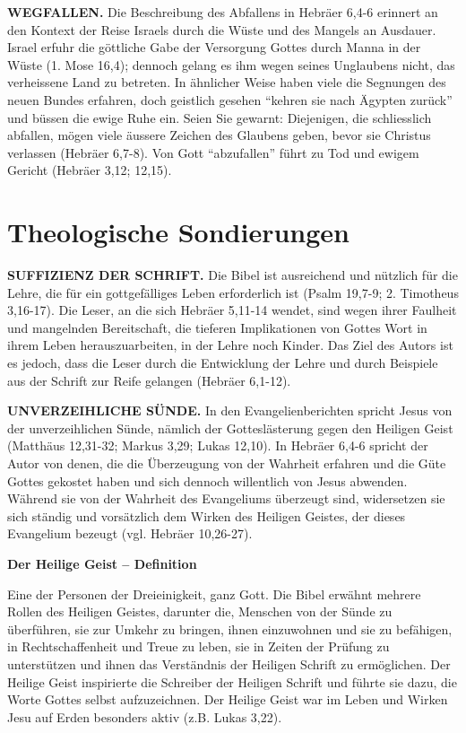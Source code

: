 \documentclass[
  12pt,
]{krantz}
\makeatletter
\newenvironment{kframe}{%
\medskip{}
\setlength{\fboxsep}{.8em}
 \def\at@end@of@kframe{}%
 \ifinner\ifhmode%
  \def\at@end@of@kframe{\end{minipage}}%
  \begin{minipage}{\columnwidth}%
 \fi\fi%
 \def\FrameCommand##1{\hskip\@totalleftmargin \hskip-\fboxsep
 \colorbox{shadecolor}{##1}\hskip-\fboxsep
     \hskip-\linewidth \hskip-\@totalleftmargin \hskip\columnwidth}%
 \MakeFramed {\advance\hsize-\width
   \@totalleftmargin\z@ \linewidth\hsize
   \@setminipage}}%
 {\par\unskip\endMakeFramed%
 \at@end@of@kframe}
\newenvironment{rmdblock}[1]
  {
  \begin{itemize}
  \renewcommand{\labelitemi}{
    \raisebox{-.7\height}[0pt][0pt]{
      {\setkeys{Gin}{width=3em,keepaspectratio}\texttt{[image: img/\#1]}}
    }
  }
  \setlength{\fboxsep}{1em}
  \begin{kframe}
  \item
  }
  {
  \end{kframe}
  \end{itemize}
  }
\newenvironment{rmddefinition}
  {\begin{rmdblock}{definition}}
  {\end{rmdblock}}
\makeatother
\begin{document}
\textbf{WEGFALLEN.} Die Beschreibung des Abfallens in Hebräer 6,4-6 erinnert an den Kontext der Reise Israels durch die Wüste und des Mangels an Ausdauer. Israel erfuhr die göttliche Gabe der Versorgung Gottes durch Manna in der Wüste (1. Mose 16,4); dennoch gelang es ihm wegen seines Unglaubens nicht, das verheissene Land zu betreten. In ähnlicher Weise haben viele die Segnungen des neuen Bundes erfahren, doch geistlich gesehen ``kehren sie nach Ägypten zurück'' und büssen die ewige Ruhe ein. Seien Sie gewarnt: Diejenigen, die schliesslich abfallen, mögen viele äussere Zeichen des Glaubens geben, bevor sie Christus verlassen (Hebräer 6,7-8). Von Gott ``abzufallen'' führt zu Tod und ewigem Gericht (Hebräer 3,12; 12,15).

\hypertarget{theologische-sondierungen}{%
\section{Theologische Sondierungen}\label{theologische-sondierungen}}

\textbf{SUFFIZIENZ DER SCHRIFT.} Die Bibel ist ausreichend und nützlich für die Lehre, die für ein gottgefälliges Leben erforderlich ist (Psalm 19,7-9; 2. Timotheus 3,16-17). Die Leser, an die sich Hebräer 5,11-14 wendet, sind wegen ihrer Faulheit und mangelnden Bereitschaft, die tieferen Implikationen von Gottes Wort in ihrem Leben herauszuarbeiten, in der Lehre noch Kinder. Das Ziel des Autors ist es jedoch, dass die Leser durch die Entwicklung der Lehre und durch Beispiele aus der Schrift zur Reife gelangen (Hebräer 6,1-12).

\textbf{UNVERZEIHLICHE SÜNDE.} In den Evangelienberichten spricht Jesus von der unverzeihlichen Sünde, nämlich der Gotteslästerung gegen den Heiligen Geist (Matthäus 12,31-32; Markus 3,29; Lukas 12,10). In Hebräer 6,4-6 spricht der Autor von denen, die die Überzeugung von der Wahrheit erfahren und die Güte Gottes gekostet haben und sich dennoch willentlich von Jesus abwenden. Während sie von der Wahrheit des Evangeliums überzeugt sind, widersetzen sie sich ständig und vorsätzlich dem Wirken des Heiligen Geistes, der dieses Evangelium bezeugt (vgl. Hebräer 10,26-27).

\begin{rmddefinition}
\textbf{Der Heilige Geist -- Definition}

Eine der Personen der Dreieinigkeit, ganz Gott. Die Bibel erwähnt
mehrere Rollen des Heiligen Geistes, darunter die, Menschen von der
Sünde zu überführen, sie zur Umkehr zu bringen, ihnen einzuwohnen und
sie zu befähigen, in Rechtschaffenheit und Treue zu leben, sie in Zeiten
der Prüfung zu unterstützen und ihnen das Verständnis der Heiligen
Schrift zu ermöglichen. Der Heilige Geist inspirierte die Schreiber der
Heiligen Schrift und führte sie dazu, die Worte Gottes selbst
aufzuzeichnen. Der Heilige Geist war im Leben und Wirken Jesu auf Erden
besonders aktiv (z.B. Lukas 3,22).
\end{rmddefinition}
\end{document}
